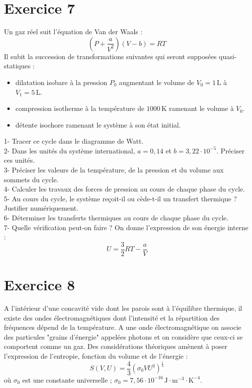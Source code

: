 \documentclass[a4paper,12pt]{article}
\begin{document}
	\section*{Exercice 7}
	Un gaz réel suit l'équation de Van der Waals :
	\begin{equation}
		\left(P + \frac{a}{V^2}\right)(V-b) = RT
	\end{equation}
	Il subit la succession de transformations suivantes qui seront supposées quasi-statiques :
	\begin{itemize}
		\item[\textbf{A $\rightarrow$ B :}] dilatation isobare à la pression $P_0$ augmentant le volume de $V_0 = 1\,\text{L}$ à $V_1 = 5\,\text{L}$.
		\item[\textbf{B $\rightarrow$ C :}] compression isotherme à la température de $1000\,\text{K}$ ramenant le volume à $V_0$.
		\item[\textbf{C $\rightarrow$ A :}] détente isochore ramenant le système à son état initial.
	\end{itemize}
	1- Tracer ce cycle dans le diagramme de Watt.\\
	2- Dans les unités du système international, $a = 0{,}14$ et $b = 3{,}22\cdot10^{-5}$. Préciser ces unités.\\
	3- Préciser les valeurs de la température, de la pression et du volume aux sommets du cycle.\\
	4- Calculer les travaux des forces de pression au cours de chaque phase du cycle.\\
	5- Au cours du cycle, le système reçoit-il ou cède-t-il un transfert thermique ? Justifier numériquement.\\
	6- Déterminer les transferts thermiques au cours de chaque phase du cycle.\\
	7- Quelle vérification peut-on faire ? On donne l'expression de son énergie interne :
	\begin{equation}
		U = \frac{3}{2}RT - \frac{a}{V}
	\end{equation}
	
	\section*{Exercice 8}
	A l'intérieur d'une concavité vide dont les parois sont à l'équilibre thermique, il existe des ondes électromagnétiques dont l'intensité et la répartition des fréquences dépend de la température. A une onde électromagnétique on associe des particules "grains d'énergie" appelées photons et on considère que ceux-ci se comportent comme un gaz. Des considérations théoriques amènent à poser l'expression de l'entropie, fonction du volume et de l'énergie :
	\begin{equation}
		S(V,U) = \frac{4}{3}(\sigma_0 V U^3)^{\frac{1}{4}}
	\end{equation}
	où $\sigma_0$ est une constante universelle ; $\sigma_0 = 7{,}56\cdot10^{-16}\,\text{J}\cdot\text{m}^{-3}\cdot\text{K}^{-4}$.
	
\end{document}
